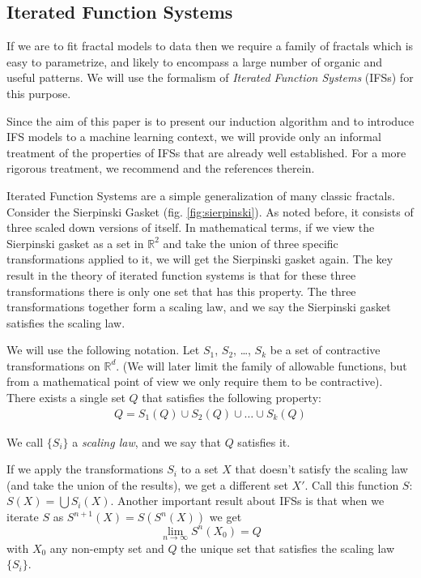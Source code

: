\documentclass[10pt,a4paper,oneside]{article}
\theoremstyle{definition}
\begin{document}
\subsection*{Iterated Function Systems}

If we are to fit fractal models to data then we require a family of fractals which is easy to parametrize, and likely to encompass a large number of organic and useful patterns. We will use the formalism of \emph{Iterated Function Systems} (IFSs) for this purpose. 

Since the aim of this paper is to present our induction algorithm and to introduce IFS models to a machine learning context, we will provide only an informal treatment of the properties of IFSs that are already well established. For a more rigorous treatment, we recommend \cite{hutchinson2000deterministic} and the references therein.

Iterated Function Systems are a simple generalization of many classic fractals. Consider the Sierpinski Gasket (fig. \ref{fig:sierpinski}). As noted before, it consists of three scaled down versions of itself. In mathematical terms, if we view the Sierpinski gasket as a set in ${\mathbb R}^2$ and take the union of three specific transformations applied to it, we will get the Sierpinski gasket again. The key result in the theory of iterated function systems is that for these three transformations there is only one set that has this property. The three transformations together form a scaling law, and we say the Sierpinski gasket satisfies the scaling law.

We will use the following notation. Let $S_1$, $S_2$, \ldots, $S_k$ be a set of contractive transformations on ${\mathbb R}^d$. (We will later limit the family of allowable functions, but from a mathematical point of view we only require them to be contractive). There exists a single set $Q$ that satisfies the following property:
\begin{align}
Q = S_1(Q) \cup S_2(Q) \cup \ldots \cup S_k(Q) \label{scaling law}
\end{align}

We call $\{S_i\}$ a \textit{scaling law}, and we say that $Q$ satisfies it.
 
If we apply the transformations $S_i$ to a set $X$ that doesn't satisfy the scaling law (and take the union of the results), we get a different set $X'$. Call this function $S$: $S(X) = \bigcup S_i(X)$. Another important result about IFSs is that when we iterate $S$ as $S^{n+1}(X) = S(S^n(X))$ we get 
\[
\lim_{n \rightarrow \infty} S^n(X_0) = Q
\]
with $X_0$ any non-empty set and $Q$ the unique set that satisfies the scaling law $\{S_i\}$.
\end{document}
